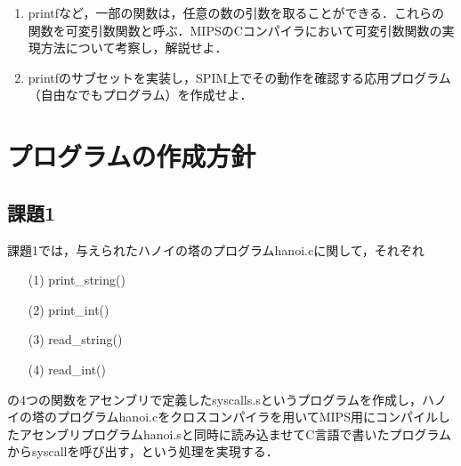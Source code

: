 \documentclass[a4j]{jarticle}
\begin{document}
\begin{enumerate}
{\baselineskip 3mm
\begin{verbatim}
int primes_stat[10];
 
char * string_ptr = "ABCDEFG";
char string_ary[] = "ABCDEFG";
 
void print_var(char *name, int val)
{
  print_string(name);
  print_string(" = ");
  print_int(val);
  print_string("\n");
}
 
main()
{
  int primes_auto[10];
 
  primes_stat[0] = 2;
  primes_auto[0] = 3;
 
  print_var("primes_stat[0]", primes_stat[0]);
  print_var("primes_auto[0]", primes_auto[0]);
}
 
\end{verbatim}
}


\item printfなど，一部の関数は，任意の数の引数を取ることができる．これらの関数を可変引数関数と呼ぶ．MIPSのCコンパイラにおいて可変引数関数の実現方法について考察し，解説せよ．

\item printfのサブセットを実装し，SPIM上でその動作を確認する応用プログラム（自由なでもプログラム）を作成せよ．

\end{enumerate}


%
%

\section{プログラムの作成方針}


\subsection{課題1}

課題1では，与えられたハノイの塔のプログラムhanoi.cに関して，それぞれ

\begin{itemize}
  \item[(1)]print\_string()
  \item[(2)]print\_int()
  \item[(3)]read\_string()
  \item[(4)]read\_int()
\end{itemize}

の4つの関数をアセンブリで定義したsyscalls.sというプログラムを作成し，ハノイの塔のプログラムhanoi.cをクロスコンパイラを用いてMIPS用にコンパイルしたアセンブリプログラムhanoi.sと同時に読み込ませてC言語で書いたプログラムからsyscallを呼び出す，という処理を実現する．
\end{document}
